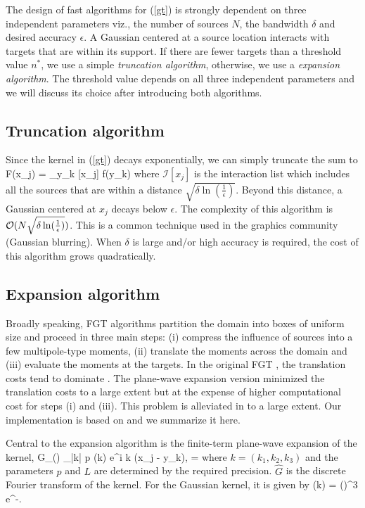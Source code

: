 
The design of fast algorithms for (\ref{gt}) is strongly dependent on three independent parameters viz., the number of sources $N$, the bandwidth $\delta$ and desired accuracy $\epsilon$. A Gaussian centered at a source location interacts with targets that are within its support. If there are fewer targets than a threshold value $n^*$, we use a simple {\em truncation algorithm}, otherwise, we use a {\em expansion algorithm}. The threshold  value depends on all three independent parameters and we will discuss its choice after introducing both algorithms. 

\subsection{Truncation algorithm} 
Since the kernel in (\ref{gt}) decays exponentially, we can simply truncate the sum to
%
\beq F(x_j) = \sum_{y_k \in {}[x_j]}  f(y_k) \label{eqn:truncation} \eeq
%
where $\mathcal{I}[x_j]$ is the interaction list which includes all the sources that are within a distance $\sqrt{\delta \ln (\frac{1}{\epsilon})}$. Beyond this distance, a Gaussian centered at $x_j$ decays below $\epsilon$. The complexity of this algorithm is $\mathcal{O}(N \sqrt{\delta \ln(\frac{1}{\epsilon})})$. This is a common technique used in the graphics community (Gaussian blurring). When $\delta$ is large and/or high accuracy is required, the cost of this algorithm grows quadratically.  

\subsection{Expansion algorithm}
Broadly speaking, FGT algorithms \cite{fgt, greengard98} partition the domain into boxes of uniform size and proceed in three main steps: (i) compress the influence of sources into a few multipole-type moments, (ii) translate the moments across the domain and (iii) evaluate the moments at the targets. In the original FGT \cite{fgt}, the translation costs tend to dominate \cite{fggt}. The plane-wave expansion version \cite{greengard98} minimized the translation costs to a large extent but at the expense of higher computational cost for steps (i) and (iii). This problem is alleviated in \cite{fggt} to a large extent. Our implementation is based on \cite{fggt} and we summarize it here. 

Central to the expansion algorithm is the finite-term plane-wave expansion of the kernel,
\beq G_\delta() \approx \sum_{|k| \leq p} (k) e^{i \lambda k \cdot (x_j - y_k)}, \quad \lambda = \eeq
where $k = (k_1, k_2, k_3)$ and the parameters $p$ and $L$ are determined by the required precision. $\hat{G}$ is the discrete Fourier transform of the kernel. For the Gaussian kernel, it is given by
\beq {}(k) = \left(\right)^3 e^{-}. \label{eqn:ghat}\eeq

